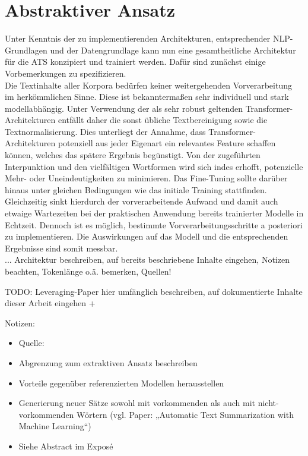 \chapter{Abstraktiver Ansatz}
\thispagestyle{fancy}
\label{chap:Abstraktiver Ansatz}

\noindent
Unter Kenntnis der zu implementierenden Architekturen, entsprechender \ac{NLP}-Grundlagen und der Datengrundlage kann nun eine gesamtheitliche Architektur für die \ac{ATS} konzipiert und trainiert werden. Dafür sind zunächst einige Vorbemerkungen zu spezifizieren.\\

\noindent
Die Textinhalte aller Korpora bedürfen keiner weitergehenden Vorverarbeitung im herkömmlichen Sinne. Diese ist bekanntermaßen sehr individuell und stark modellabhängig. Unter Verwendung der als sehr robust geltenden Transformer-Architekturen entfällt daher die sonst übliche Textbereinigung sowie die Textnormalisierung. Dies unterliegt der Annahme, dass Transformer-Architekturen potenziell aus jeder Eigenart ein relevantes Feature schaffen können, welches das spätere Ergebnis begünstigt. Von der zugeführten Interpunktion und den vielfältigen Wortformen wird sich indes erhofft, potenzielle Mehr- oder Uneindeutigkeiten zu minimieren. Das Fine-Tuning sollte darüber hinaus unter gleichen Bedingungen wie das initiale Training stattfinden. Gleichzeitig sinkt hierdurch der vorverarbeitende Aufwand und damit auch etwaige Wartezeiten bei der praktischen Anwendung bereits trainierter Modelle in Echtzeit. Dennoch ist es möglich, bestimmte Vorverarbeitungsschritte a posteriori zu implementieren. Die Auswirkungen auf das Modell und die entsprechenden Ergebnisse sind somit messbar.\\

... Architektur beschreiben, auf bereits beschriebene Inhalte eingehen, Notizen beachten, Tokenlänge o.ä. bemerken, Quellen!

TODO: Leveraging-Paper hier umfänglich beschreiben, auf dokumentierte Inhalte dieser Arbeit eingehen + \cite{VAS17}

Notizen:
\begin{itemize}
	\item Quelle: \cite{NIT19}
	\item Abgrenzung zum extraktiven Ansatz beschreiben
	\item Vorteile gegenüber referenzierten Modellen herausstellen
	\item Generierung neuer Sätze sowohl mit vorkommenden als auch mit nicht-vorkommenden Wörtern (vgl. Paper: „Automatic Text Summarization with Machine Learning“)
	\item Siehe Abstract im Exposé
\end{itemize}


